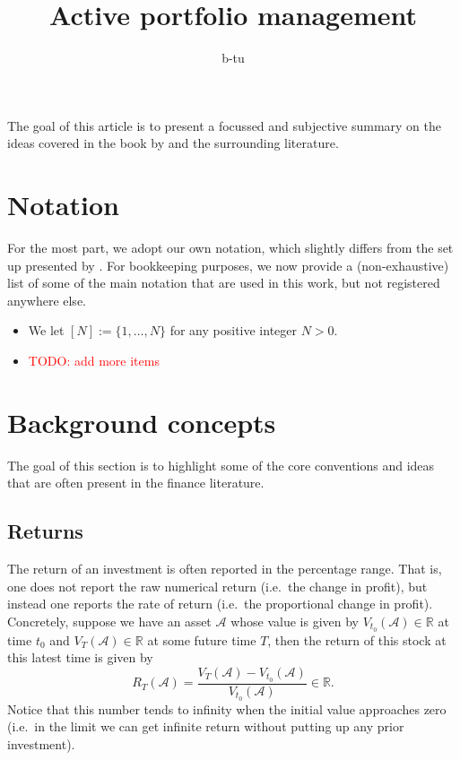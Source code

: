 \documentclass[12pt]{article}
\title{Active portfolio management}
\author{
	b-tu
}
\begin{document}
\maketitle
The goal of this article is to present a focussed and subjective summary on the ideas covered in the book by \cite{grinold1999} and the surrounding literature.
\section{Notation}
For the most part, we adopt our own notation, which slightly differs from the set up presented by \cite{grinold1999}. For bookkeeping purposes, we now provide a (non-exhaustive) list of some of the main notation that are used in this work, but not registered anywhere else.
\begin{itemize}
    \item We let $[N] := \{1,\dots,N\}$ for any positive integer $N > 0$.
    \item \textcolor{red}{TODO: add more items}
\end{itemize}
\section{Background concepts}
The goal of this section is to highlight some of the core conventions and ideas that are often present in the finance literature.
\subsection{Returns}
The return of an investment is often reported in the percentage range. That is, one does not report the raw numerical return (i.e.\ the change in profit), but instead one reports the rate of return (i.e.\ the proportional change in profit). Concretely, suppose we have an asset $\mathcal{A}$ whose value is given by $V_{t_0}(\mathcal{A}) \in \mathbb{R}$ at time $t_0$ and $V_T(\mathcal{A}) \in \mathbb{R}$ at some future time $T$, then the return of this stock at this latest time is given by
\begin{equation}
    R_T(\mathcal{A}) = \frac{V_T(\mathcal{A}) - V_{t_0}(\mathcal{A})}{V_{t_0}(\mathcal{A})} \in \mathbb{R}.
    \label{eqn:return}
\end{equation}
Notice that this number tends to infinity when the initial value approaches zero (i.e.\ in the limit we can get infinite return without putting up any prior investment).
\end{document}
